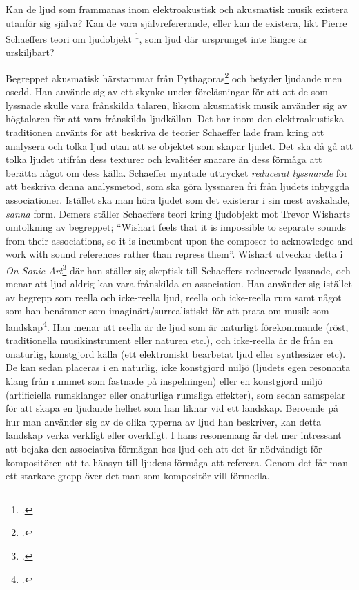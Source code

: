 \documentclass{article}
\begin{document}
Kan de ljud som frammanas inom elektroakustisk och akusmatisk musik existera utanför sig själva? Kan de vara
självrefererande, eller kan de existera, likt Pierre Schaeffers teori om ljudobjekt
\footcite{PierreSchaeffer}, som ljud där ursprunget inte längre är urskiljbart?

Begreppet akusmatisk härstammar från Pythagoras\footcite{oxford} och betyder ljudande men osedd. Han använde
sig av ett skynke under föreläsningar för att att de som lyssnade skulle vara frånskilda talaren, liksom
akusmatisk musik använder sig av högtalaren för att vara frånskilda ljudkällan. Det har inom den
elektroakustiska traditionen använts för att beskriva de teorier Schaeffer lade fram kring att analysera och
tolka ljud utan att se objektet som skapar ljudet. Det ska då gå att tolka ljudet utifrån dess texturer och
kvalitéer snarare än dess förmåga att berätta något om dess källa. Schaeffer myntade uttrycket \emph{reducerat
lyssnande} för att beskriva denna analysmetod, som ska göra lyssnaren fri från ljudets inbyggda associationer.
Istället ska man höra ljudet som det existerar i sin mest avskalade, \emph{sanna} form. Demers ställer
Schaeffers teori kring ljudobjekt mot Trevor Wisharts omtolkning av begreppet; ``Wishart feels that it is
impossible to separate sounds from their associations, so it is incumbent upon the composer to acknowledge and
work with sound references rather than repress them''. Wishart utveckar detta i \emph{On Sonic Art}\footcite{TrevorWishart} där han ställer sig skeptisk till Schaeffers reducerade lyssnade, och menar att
ljud aldrig kan vara frånskilda en association. Han använder sig istället av begrepp som reella och
icke-reella ljud, reella och icke-reella rum samt något som han benämner som imaginärt/surrealistiskt för att
prata om musik som landskap\footcite[144-147]{TrevorWishart}. Han menar att reella är de ljud som är naturligt
förekommande (röst, traditionella musikinstrument eller naturen etc.), och icke-reella är de från en
onaturlig, konstgjord källa (ett elektroniskt bearbetat ljud eller synthesizer etc). De kan sedan placeras i
en naturlig, icke konstgjord miljö (ljudets egen resonanta klang från rummet som fastnade på inspelningen)
eller en konstgjord miljö (artificiella rumsklanger eller onaturliga rumsliga effekter), som sedan samspelar
för att skapa en ljudande helhet som han liknar vid ett landskap. Beroende på hur man använder sig av de olika
typerna av ljud han beskriver, kan detta landskap verka verkligt eller overkligt. I hans resonemang är det mer
intressant att bejaka den associativa förmågan hos ljud och att det är nödvändigt för kompositören att ta
hänsyn till ljudens förmåga att referera. Genom det får man ett starkare grepp över det man som kompositör
vill förmedla.
\end{document}
